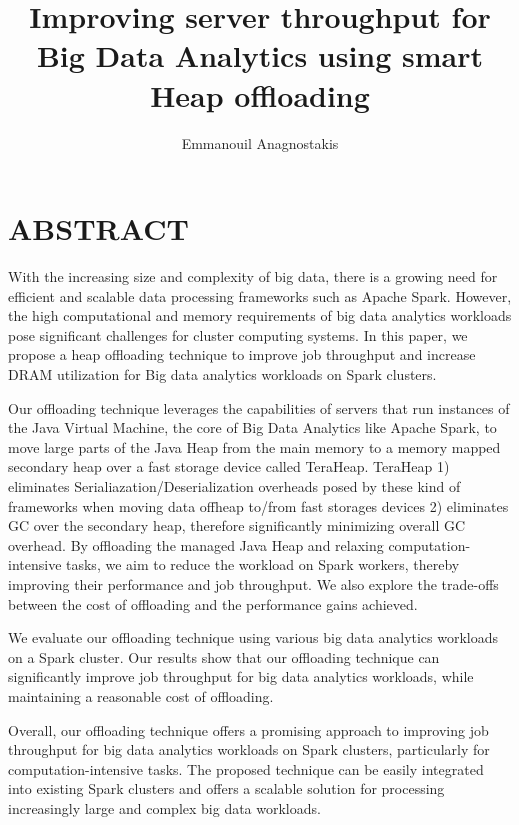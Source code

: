 \documentclass[twocolumn,10pt]{asme2e}
\title{Improving server throughput for Big Data Analytics using smart Heap offloading}
\author{Emmanouil Anagnostakis
    \affiliation{
	    Graduate Research Assistant\\
	    Computer Architecture and VLSI Systems Laboratory, ICS-FORTH\\
	    Heraklion, Greece\\
      manosanag@ics.forth.gr
    }	
}
\begin{document}
\maketitle    

\section*{ABSTRACT}

With the increasing size and complexity of big data, there is a growing need for efficient and scalable data processing frameworks such as Apache Spark. However, the high computational and memory requirements of big data analytics workloads pose significant challenges for cluster computing systems. In this paper, we propose a heap offloading technique to improve job throughput and increase DRAM utilization for Big data analytics workloads on Spark clusters.

Our offloading technique leverages the capabilities of servers that run instances of the Java Virtual Machine, the core of Big Data Analytics like Apache Spark, to move large parts of the Java Heap from the main memory to a memory mapped secondary heap over a fast storage device called TeraHeap. TeraHeap 1) eliminates Serialiazation/Deserialization overheads posed by these kind of frameworks when moving data offheap to/from fast storages devices 2) eliminates GC over the secondary heap, therefore significantly minimizing overall GC overhead. By offloading the managed Java Heap and relaxing computation-intensive tasks, we aim to reduce the workload on Spark workers, thereby improving their performance and job throughput. We also explore the trade-offs between the cost of offloading and the performance gains achieved.

We evaluate our offloading technique using various big data analytics workloads on a Spark cluster. Our results show that our offloading technique can significantly improve job throughput for big data analytics workloads, while maintaining a reasonable cost of offloading.

\par Overall, our offloading technique offers a promising approach to improving job throughput for big data analytics workloads on Spark clusters, particularly for computation-intensive tasks. The proposed technique can be easily integrated into existing Spark clusters and offers a scalable solution for processing increasingly large and complex big data workloads.
\end{document}
